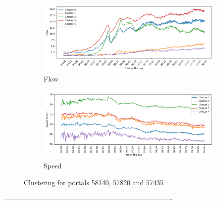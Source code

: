 	
	\begin{figure}[H]
		\centering
		\begin{subfigure}{0.9 \linewidth}
			\includegraphics[width=\textwidth]{../Plots/Flow/clustering_3portals}
			\caption{Flow}
		\end{subfigure}
		\begin{subfigure}{0.9 \linewidth}
			\includegraphics[width=\textwidth]{../Plots/Speed/clustering_3portals}
			\caption{Speed}
		\end{subfigure}
		\caption{Clustering for portals 58140, 57820 and 57435}
		\label{fig:clustering_3portals}
	\end{figure}

	-------------------------------------------------------------------------%
	
	\newpage
	
	
	
	
